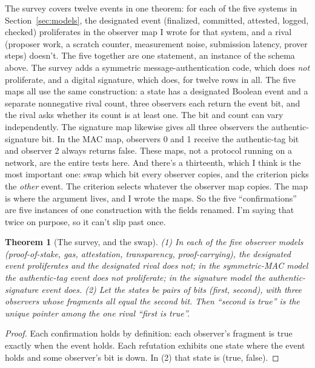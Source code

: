 \documentclass[11pt,twoside]{article}
\theoremstyle{thielethm}
\newtheorem{theorem}{Theorem}[section]
\theoremstyle{thieledef}
\theoremstyle{thieledef}
\theoremstyle{thieledef}
\theoremstyle{thielethm}
\theoremstyle{thieleobs}
\theoremstyle{thielethm}
\begin{document}
The survey covers twelve events in one theorem: for each of the five systems in Section~\ref{sec:models}, the
designated event (finalized, committed, attested, logged, checked) proliferates in the
observer map I wrote for that system, and a rival (proposer work, a scratch counter,
measurement noise, submission latency, prover steps) doesn't. The five together are one
statement, an instance of the schema above.
The survey adds a symmetric message-authentication code, which does \emph{not} proliferate, and a digital
signature, which does, for twelve rows in all. The five maps all use the same construction: a state has a designated
Boolean event and a separate nonnegative rival count, three observers each return
the event bit, and the rival asks whether its count is at least one. The bit and
count can vary independently. The signature map likewise gives all three observers
the authentic-signature bit. In the MAC map, observers 0 and 1 receive the authentic-tag
bit and observer 2 always returns false. These maps, not a protocol running
on a network, are the entire tests here. And there's a thirteenth, which I think is the most important one: swap which bit
every observer copies, and the criterion picks the \emph{other} event. The criterion selects
whatever the observer map copies. The map is where the argument lives, and I wrote the maps.
So the five ``confirmations'' are five instances of one construction with the fields renamed.
I'm saying that twice on
purpose, so it can't slip past once.

\begin{theorem}[The survey, and the swap]\label{thm:u14-survey}
(1) In each of the five observer models (proof-of-stake, gas, attestation, transparency,
proof-carrying), the designated event proliferates and the designated rival does not; in the
symmetric-MAC model the authentic-tag event does not proliferate; in the signature model the
authentic-signature event does. (2) Let the states be pairs of bits (first, second), with
three observers whose fragments all equal the second bit. Then ``second is true'' is the
unique pointer among the one rival ``first is true''.
\end{theorem}

\begin{proof}
Each confirmation holds by definition: each observer's fragment is true exactly when the
event holds.
Each refutation exhibits one state where the event holds and some observer's bit is down.
In (2) that state is (true, false).
\end{proof}
\end{document}

